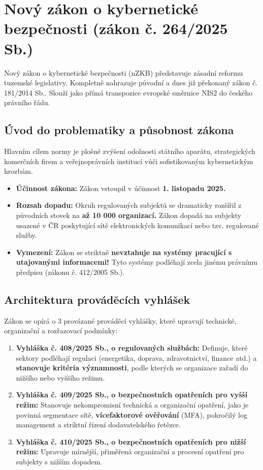 \documentclass[10pt,a4paper]{article}
\begin{document}
	
	\section{Nový zákon o kybernetické bezpečnosti (zákon č. 264/2025 Sb.)}
	
	Nový zákon o kybernetické bezpečnosti (nZKB) představuje zásadní reformu tuzemské legislativy. Kompletně nahrazuje původní a dnes již překonaný zákon č. 181/2014 Sb.. Slouží jako přímá transpozice evropské směrnice NIS2 do českého právního řádu.
	
	\subsection{Úvod do problematiky a působnost zákona}
	Hlavním cílem normy je plošné zvýšení odolnosti státního aparátu, strategických komerčních firem a veřejnoprávních institucí vůči sofistikovaným kybernetickým hrozbám.
	
	\begin{itemize}
		\item \textbf{Účinnost zákona:} Zákon vstoupil v účinnost \textbf{1. listopadu 2025.}
		
		\item \textbf{Rozsah dopadu:} Okruh regulovaných subjektů se dramaticky rozšířil z původních stovek na \textbf{až 10 000 organizací.} Zákon dopadá na subjekty usazené v ČR poskytující sítě elektronických komunikací nebo tzv. regulované služby.
		
		\item \textbf{Vymezení:} Zákon se striktně \textbf{nevztahuje na systémy pracující s utajovanými informacemi!} Tyto systémy podléhají zcela jinému právnímu předpisu (zákonu č. 412/2005 Sb.).
	\end{itemize}
	
	\subsection{Architektura prováděcích vyhlášek}
	Zákon se opírá o 3 provázané prováděcí vyhlášky, které upravují technické, organizační a rozřazovací podmínky:
	\begin{enumerate}
		\item \textbf{Vyhláška č. 408/2025 Sb., o regulovaných službách:} Definuje, které sektory podléhají regulaci (energetika, doprava, zdravotnictví, finance atd.) a \textbf{stanovuje kritéria významnosti}, podle kterých se organizace zařadí do nižšího nebo vyššího režimu.
		
		\item \textbf{Vyhláška č. 409/2025 Sb., o bezpečnostních opatřeních pro vyšší režim:} Stanovuje nekompromisní technická a organizační opatření, jako je povinná segmentace sítě, \textbf{vícefaktorové ověřování} (MFA), pokročilý log management a striktní řízení dodavatelského řetězce.
		
		\item \textbf{Vyhláška č. 410/2025 Sb., o bezpečnostních opatřeních pro nižší režim:} Upravuje mírnější, přiměřená organizační a procesní opatření pro subjekty s nižším dopadem.
	\end{enumerate}
	
\end{document}

